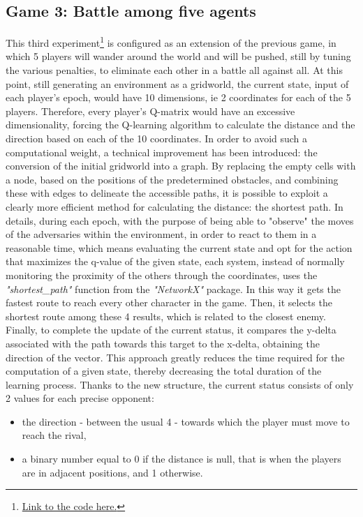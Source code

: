 \subsection{Game 3: Battle among five agents}
This third experiment\footnote{\href{https://github.com/moiraghif/DragonHunting/tree/master/Duel_2}{Link to the code here.}} is configured as an extension of the previous game, in which 5 players will wander around the world and will be pushed, still by tuning the various penalties, to eliminate each other in a battle all against all. At this point, still generating an environment as a gridworld, the current state, input of each player's epoch, would have 10 dimensions, ie 2 coordinates for each of the 5 players. Therefore, every player's Q-matrix would have an excessive dimensionality, forcing the Q-learning algorithm to calculate the distance and the direction based on each of the 10 coordinates. In order to avoid such a computational weight, a technical improvement has been introduced: the conversion of the initial gridworld into a graph. By replacing the empty cells with a node, based on the positions of the predetermined obstacles, and combining these with edges to delineate the accessible paths, it is possible to exploit a clearly more efficient method for calculating the distance: the shortest path. In details, during each epoch, with the purpose of being able to "observe" the moves of the adversaries within the environment, in order to react to them in a reasonable time, which means evaluating the current state and opt for the action that maximizes the q-value of the given state, each system, instead of normally monitoring the proximity of the others through the coordinates, uses the \textit{"shortest\_path"} function from the \textit{"NetworkX"} package. In this way it gets the fastest route to reach every other character in the game. Then, it selects the shortest route among these 4 results, which is related to the closest enemy. Finally, to complete the update of the current status, it compares the y-delta associated with the path towards this target to the x-delta, obtaining the direction of the vector. This approach greatly reduces the time required for the computation of a given state, thereby decreasing the total duration of the learning process. Thanks to the new structure, the current status consists of only 2 values for each precise opponent:
\begin{itemize}
  \item the direction - between the usual 4 - towards which the player must move to reach the rival,
  \item a binary number equal to 0 if the distance is null, that is when the players are in adjacent positions, and 1 otherwise.
\end{itemize}
